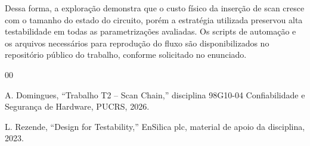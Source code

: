 \documentclass[conference]{IEEEtran}
\begin{document}
Dessa forma, a exploração demonstra que o custo físico da inserção de scan cresce com o tamanho do estado do circuito, porém a estratégia utilizada preservou alta testabilidade em todas as parametrizações avaliadas. Os scripts de automação e os arquivos necessários para reprodução do fluxo são disponibilizados no repositório público do trabalho, conforme solicitado no enunciado.

\begin{thebibliography}{00}

A. Domingues, ``Trabalho T2 -- Scan Chain,'' disciplina 98G10-04 Confiabilidade e Segurança de Hardware, PUCRS, 2026.

L. Rezende, ``Design for Testability,'' EnSilica plc, material de apoio da disciplina, 2023.

\end{thebibliography}
\end{document}
